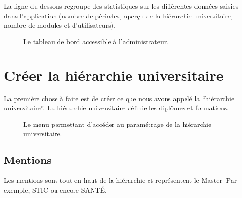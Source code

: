 \documentclass[letterpaper,10pt,french]{sphinxmanual}
\begin{document}
La ligne du dessous regroupe des statistiques sur les différentes données saisies dans l'application (nombre de périodes, aperçu de la hiérarchie universitaire, nombre de modules et d'utilisateurs).
\begin{figure}[htbp]
\centering
\capstart

\caption{Le tableau de bord accessible à l'administrateur.}\end{figure}


\section{Créer la hiérarchie universitaire}
\label{admin:creer-la-hierarchie-universitaire}
La première chose à faire est de créer ce que nous avons appelé la ``hiérarchie universitaire''. La hiérarchie universitaire définie les diplômes et formations.
\begin{figure}[htbp]
\centering
\capstart

\caption{Le menu permettant d'accéder au paramétrage de la hiérarchie universitaire.}\end{figure}


\subsection{Mentions}
\label{admin:mentions}
Les mentions sont tout en haut de la hiérarchie et représentent le Master. Par exemple, STIC ou encore SANTÉ.
\end{document}

